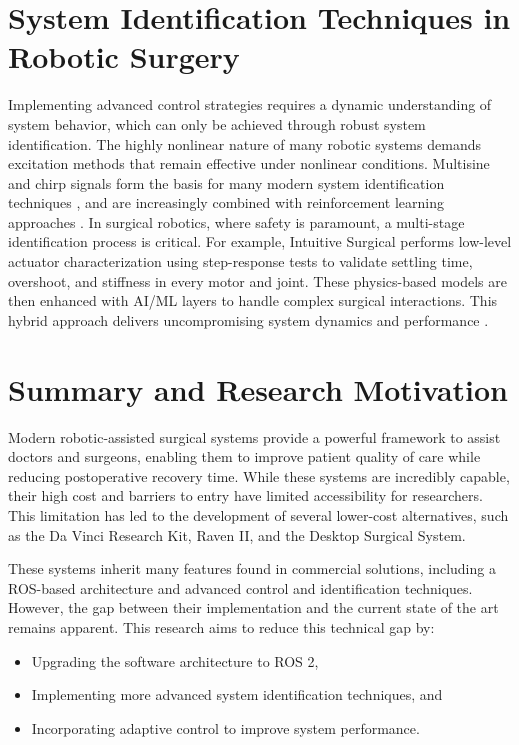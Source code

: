 \section{System Identification Techniques in Robotic Surgery}

Implementing advanced control strategies requires a dynamic understanding of system behavior, which can only be achieved through robust system identification. The highly nonlinear nature of many robotic systems demands excitation methods that remain effective under nonlinear conditions. Multisine and chirp signals form the basis for many modern system identification techniques \cite{Xia1997ChirpSignals}, and are increasingly combined with reinforcement learning approaches \cite{MARTINSEN20208130}. In surgical robotics, where safety is paramount, a multi-stage identification process is critical. For example, Intuitive Surgical performs low-level actuator characterization using step-response tests to validate settling time, overshoot, and stiffness in every motor and joint. These physics-based models are then enhanced with AI/ML layers to handle complex surgical interactions. This hybrid approach delivers uncompromising system dynamics and performance \cite{US20230309921A1}.

\section{Summary and Research Motivation}

Modern robotic-assisted surgical systems provide a powerful framework to assist doctors and surgeons, enabling them to improve patient quality of care while reducing postoperative recovery time. While these systems are incredibly capable, their high cost and barriers to entry have limited accessibility for researchers. This limitation has led to the development of several lower-cost alternatives, such as the Da Vinci Research Kit, Raven II, and the Desktop Surgical System.

These systems inherit many features found in commercial solutions, including a ROS-based architecture and advanced control and identification techniques. However, the gap between their implementation and the current state of the art remains apparent. This research aims to reduce this technical gap by:
\begin{itemize}
    \item Upgrading the software architecture to ROS 2,
    \item Implementing more advanced system identification techniques, and
    \item Incorporating adaptive control to improve system performance.
\end{itemize}